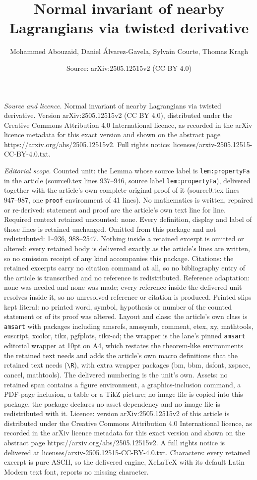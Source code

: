 \documentclass[10pt,a4paper]{amsart}
\title[Normal invariant of nearby Lagrangians via twisted derivativ]{Normal invariant of nearby Lagrangians via twisted derivative}
\author{Mohammed Abouzaid, Daniel \'Alvarez-Gavela, Sylvain Courte, Thomas Kragh}
\date{Source: arXiv:2505.12515v2 (CC BY 4.0)}
\begin{document}
\maketitle

\noindent\emph{Source and licence.} Normal invariant of nearby Lagrangians via twisted derivative. Version arXiv:2505.12515v2 (CC BY 4.0), distributed under the Creative Commons Attribution 4.0 International licence, as recorded in the arXiv licence metadata for this exact version and shown on the abstract page https://arxiv.org/abs/2505.12515v2. Full rights notice: licenses/arxiv-2505.12515-CC-BY-4.0.txt.\par\smallskip

\noindent\textit{Editorial scope.} Counted unit: the Lemma whose source label is \texttt{lem:propertyFa} in the article (source0.tex lines 937--946, source label \texttt{lem:propertyFa}), delivered together with the article's own complete original proof of it (source0.tex lines 947--987, one \texttt{proof} environment of 41 lines). No mathematics is written, repaired or re-derived: statement and proof are the article's own text line for line. Required context retained uncounted: none. Every definition, display and label of those lines is retained unchanged. Omitted from this package and not redistributed: 1--936, 988--2547. Nothing inside a retained excerpt is omitted or altered: every retained body is delivered exactly as the article's lines are written, so no omission receipt of any kind accompanies this package. Citations: the retained excerpts carry no citation command at all, so no bibliography entry of the article is transcribed and no reference is redistributed. Reference adaptation: none was needed and none was made; every reference inside the delivered unit resolves inside it, so no unresolved reference or citation is produced. Printed slips kept literal: no printed word, symbol, hypothesis or number of the counted statement or of its proof was altered. Layout and class: the article's own class is \texttt{amsart} with packages including amsrefs, amssymb, comment, etex, xy, mathtools, euscript, xcolor, tikz, pgfplots, tikz-cd; the wrapper is the lane's pinned \texttt{amsart} editorial wrapper at 10pt on A4, which restates the theorem-like environments the retained text needs and adds the article's own macro definitions that the retained text needs (\texttt{\textbackslash R}), with extra wrapper packages (bm, bbm, dsfont, xspace, cancel, mathtools). The delivered numbering is the unit's own. Assets: no retained span contains a figure environment, a graphics-inclusion command, a PDF-page inclusion, a table or a TikZ picture; no image file is copied into this package, the package declares no asset dependency and no image file is redistributed with it. Licence: version arXiv:2505.12515v2 of this article is distributed under the Creative Commons Attribution 4.0 International licence, as recorded in the arXiv licence metadata for this exact version and shown on the abstract page https://arxiv.org/abs/2505.12515v2. A full rights notice is delivered at licenses/arxiv-2505.12515-CC-BY-4.0.txt. Characters: every retained excerpt is pure ASCII, so the delivered engine, XeLaTeX with its default Latin Modern text font, reports no missing character.
\end{document}
